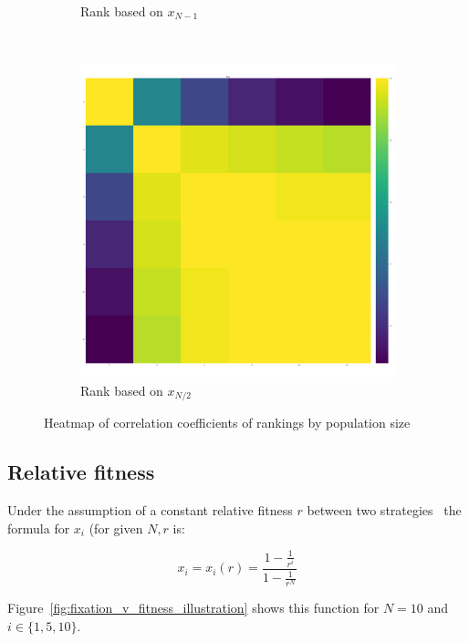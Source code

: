 \documentclass{article}
\begin{document}
\begin{figure}[!htbp]
\begin{subfigure}[t]{.3\textwidth}
        \caption{Rank based on \(x_{N - 1}\)}
    \end{subfigure}
    ~
    \begin{subfigure}[t]{.3\textwidth}
        \centering
        \includegraphics[width=.9\textwidth]{./img/correlation_heatmap_coexist.pdf}
        \caption{Rank based on \(x_{N/2}\)}
    \end{subfigure}
    \caption{Heatmap of correlation coefficients of rankings by population size}
    \label{fig:correlation_coefficients}
\end{figure}

\subsection{Relative fitness}\label{sec:relative_fitness}


Under the assumption of a constant relative fitness \(r\) between two
strategies~\cite{Nowak} the formula for \(x_i\) (for given \(N, r\) is:

\begin{equation}\label{equ:fixation_probability_with_constant_relative_fitness}
    x_i = x_i(r) = \frac{1-\frac{1}{r^{i}}}{1-\frac{1}{r^{N}}}
\end{equation}

Figure~\ref{fig:fixation_v_fitness_illustration} shows this function for
\(N=10\) and \(i\in\{1, 5, 10\}\).
\end{document}
